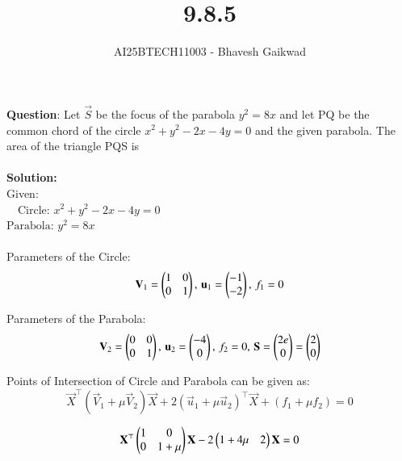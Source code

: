 \documentclass[journal]{IEEEtran}
\begin{document}

\vspace{3cm}

\title{9.8.5}
\author{AI25BTECH11003 - Bhavesh Gaikwad}
{\let\newpage\relax\maketitle}

\renewcommand{\thefigure}{\theenumi}
\renewcommand{\thetable}{\theenumi}
\setlength{\intextsep}{10pt} 


\renewcommand{\thetable}{\theenumi}


\textbf{Question}: Let $\vec{S}$ be the focus of the parabola $y^2 = 8x$ and let PQ be the common chord of the circle $x^2 + y^2 - 2x - 4y = 0$ and the given parabola. The area of the triangle PQS is\\\\

\textbf{Solution:}\\
  Given:\\
$\quad \text{Circle: }x^2 + y^2 - 2x - 4y = 0$\\
$\text{Parabola: }y^2 = 8x$\\\\


Parameters of the Circle:
\begin{equation}
\mathbf{V}_1 = \begin{pmatrix}1 & 0 \\ 0 & 1\end{pmatrix}, \, \mathbf{u}_1 = \begin{pmatrix}-1 \\ -2\end{pmatrix}, \, f_1 = 0   
\end{equation}

Parameters of the Parabola:
\begin{equation}
\mathbf{V}_2 = \begin{pmatrix}0 & 0 \\ 0 & 1\end{pmatrix}, \, \mathbf{u}_2 = \begin{pmatrix}-4 \\ 0\end{pmatrix}, \, f_2 = 0, \, \mathbf{S} = \begin{pmatrix}2e \\ 0 \end{pmatrix} = \begin{pmatrix}2 \\ 0\end{pmatrix}   
\end{equation}

Points of Intersection of Circle and Parabola can be given as:
\begin{equation}
\vec{X}^\top(\vec{V}_1+\mu\vec{V}_2)\vec{X} + 2(\vec{u}_1+\mu\vec{u}_2)^\top\vec{X} + (f_1 + \mu f_2) = 0
\end{equation}

\begin{equation}
\mathbf{X}^\top\begin{pmatrix}1 & 0 \\ 0 & 1+\mu\end{pmatrix}\mathbf{X} - 2\begin{pmatrix}1+4\mu & 2\end{pmatrix}\mathbf{X} = 0    
\end{equation}
\end{document}
